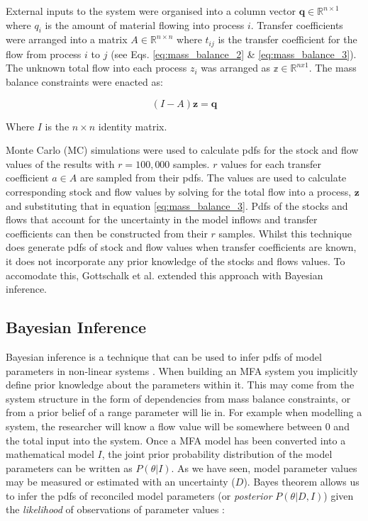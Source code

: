\documentclass[ %
                    author={Tom Jager},
                supervisor={Dr. Daniel Schien},
                    degree={MEng},
                     title={A Bayesian Inference Engine for UMIS Structured Data},
                  subtitle={},
                      type={research},
                      year={2019} ]{dissertation}
\begin{document}
External inputs to the system were organised into a column vector $\mathbf{q} \in \mathbb{R}^{n \times 1}$ where $q_i$ is the amount of material flowing into process $i$. Transfer coefficients were arranged into a matrix $A \in \mathbb{R}^{n \times n}$ where $t_{ij}$ is the transfer coefficient for the flow from process $i$ to $j$ (see Eqs. \ref{eq:mass_balance_2} \& \ref{eq:mass_balance_3}). The unknown total flow into each process $z_i$ was arranged as $\mathbb{z} \in \mathbb{R}^{nx1}$. The mass balance constraints were enacted as:

\begin{equation}
\label{eq:gottschalk_eq}
    (I-A)\bm{z} = \bm{q}
\end{equation}

Where $I$ is the $n \times n$ identity matrix.

Monte Carlo (MC) simulations were used to calculate pdfs for the stock and flow values of the results with $r=100,000$ samples. $r$ values for each transfer coefficient $a \in A$ are sampled from their pdfs. The values are used to calculate corresponding stock and flow values by solving for the total flow into a process, $\bm{z}$ and substituting that in equation \ref{eq:mass_balance_3}. Pdfs of the stocks and flows that account for the uncertainty in the model inflows and transfer coefficients can then be constructed from their $r$ samples. Whilst this technique does generate pdfs of stock and flow values when transfer coefficients are known, it does not incorporate any prior knowledge of the stocks and flows values. To accomodate this, Gottschalk et al. extended this approach with Bayesian inference.

\subsection{Bayesian Inference}

Bayesian inference is a technique that can be used to infer pdfs of model parameters in non-linear systems \cite{green2015bayesian}. When building an MFA system you implicitly define prior knowledge about the parameters within it. This may come from the system structure in the form of dependencies from mass balance constraints, or from a prior belief of a range parameter will lie in. For example when modelling a system, the researcher will know a flow value will be somewhere between 0 and the total input into the system. Once a MFA model has been converted into a mathematical model $I$, the joint prior probability distribution of the model parameters can be written as $P(\theta|I)$. As we have seen, model parameter values may be measured or estimated with an uncertainty ($D$). Bayes theorem allows us to infer the pdfs of reconciled model parameters (or \textit{posterior} $P(\theta | D, I)$) given the \textit{likelihood} of observations of parameter values \cite{lupton2018incremental}:
\end{document}
